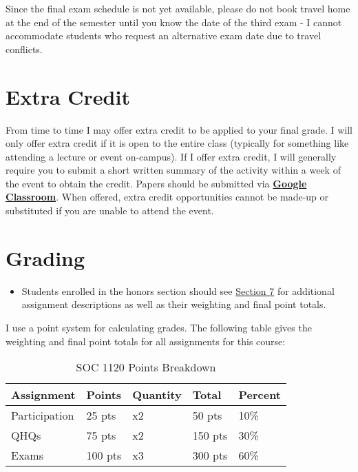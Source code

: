 \documentclass[]{book}
\newenvironment{rmdblock}[1]
  {\begin{shaded*}
  \begin{itemize}
  \renewcommand{\labelitemi}{
    \raisebox{-.7\height}[0pt][0pt]{
      {\setkeys{Gin}{width=3em,keepaspectratio}\texttt{[image: images/\#1]}}
    }
  }
  \item
  }
  {
  \end{itemize}
  \end{shaded*}
  }
\newenvironment{rmdwarning}
  {\begin{rmdblock}{warning}}
  {\end{rmdblock}}
\begin{document}
Since the final exam schedule is not yet available, please do not book travel home at the end of the semester until you know the date of the third exam - I cannot accommodate students who request an alternative exam date due to travel conflicts.

\hypertarget{extra-credit}{%
\section{Extra Credit}\label{extra-credit}}

From time to time I may offer extra credit to be applied to your final grade. I will only offer extra credit if it is open to the entire class (typically for something like attending a lecture or event on-campus). If I offer extra credit, I will generally require you to submit a short written summary of the activity within a week of the event to obtain the credit. Papers should be submitted via \textbf{\href{https://classroom.google.com}{Google Classroom}}. When offered, extra credit opportunities cannot be made-up or substituted if you are unable to attend the event.

\hypertarget{grading}{%
\section{Grading}\label{grading}}

\begin{rmdwarning}
Students enrolled in the honors section should see
\href{/syllabus/honors-overview.html}{Section 7} for additional
assignment descriptions as well as their weighting and final point
totals.
\end{rmdwarning}

I use a point system for calculating grades. The following table gives the weighting and final point totals for all assignments for this course:

\begin{table}

\caption{\label{tab:unnamed-chunk-6}SOC 1120 Points Breakdown}
\centering
\begin{tabular}[t]{lllll}
\toprule
Assignment & Points & Quantity & Total & Percent\\
\midrule
Participation & 25 pts & x2 & 50 pts & 10\%\\
QHQs & 75 pts & x2 & 150 pts & 30\%\\
Exams & 100 pts & x3 & 300 pts & 60\%\\
\bottomrule
\end{tabular}
\end{table}
\end{document}
